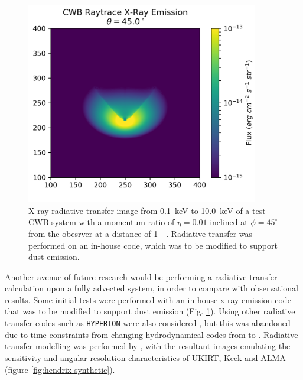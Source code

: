 
\begin{figure}[ht]
  \centering
  \includegraphics[width=4in]{assets/ray/cwb-raytrace-045.0.png}
  \caption{X-ray radiative transfer image from \SI{0.1}{\kilo\electronvolt} to \SI{10.0}{\kilo\electronvolt} of a test CWB system with a momentum ratio of $\eta = 0.01$ inclined at $\phi = 45^\circ$ from the obesrver at a distance of \SI{1}{\kilo\parsec}. Radiative transfer was performed on an in-house code, which was to be modified to support dust emission.}
  \label{fig:inhousert}
\end{figure}

Another avenue of future research would be performing a radiative transfer calculation upon a fully advected system, in order to compare with observational results.
Some initial tests were performed with an in-house x-ray emission code that was to be modified to support dust emission (Fig. \ref{fig:inhousert}).
Using other radiative transfer codes such as \texttt{HYPERION} were also considered \parencite{robitailleHYPERIONOpensourceParallelized2011}, but this was abandoned due to time constraints from changing hydrodynamical codes from \mg{} to \athena{}.
Radiative transfer modelling was performed by \textcite{hendrix_pinwheels_2016}, with the resultant images emulating the sensitivity and angular resolution characteristics of UKIRT, Keck and ALMA (figure \ref{fig:hendrix-synthetic}).

